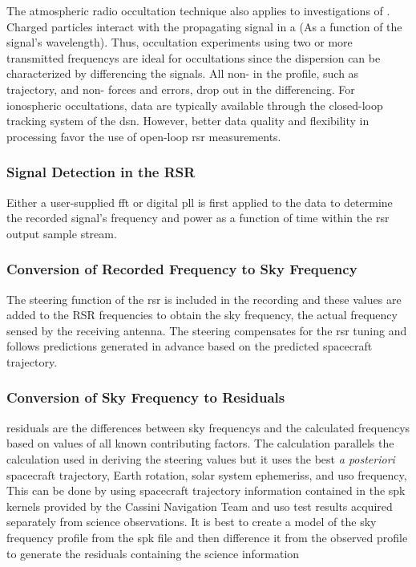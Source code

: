 \documentclass[oneside]{book}
\theoremstyle{mystyle}
\begin{document}
The atmospheric radio \gls{occultation} technique also applies to investigations of . Charged particles interact with the propagating signal in a  (As a function of the signal’s wavelength). Thus, \gls{occultation} experiments using two or more transmitted \glspl{frequency} are ideal for  \glspl{occultation} since the \gls{dispersion} can be characterized by differencing the signals. All non- in the  profile, such as \gls{trajectory},  and non- forces and errors, drop out in the differencing. For ionospheric \glspl{occultation},  data are typically available through the \gls{closed-loop} tracking system of the \gls{dsn}. However, better data quality and flexibility in processing favor the use of \gls{open-loop} \gls{rsr} measurements.

\subsubsection{\footnotesize Signal Detection in the RSR}

Either a user-supplied \gls{fft} or digital \gls{pll} is first applied to the data to determine the recorded signal’s \gls{frequency} and \gls{power} as a function of time within the \gls{rsr} output sample stream. 

\subsubsection{\footnotesize Conversion of Recorded Frequency to Sky Frequency}

The \gls{steering function} of the \gls{rsr} is included in the recording and these values are added to the RSR frequencies to obtain the sky frequency, the actual \gls{frequency} sensed by the receiving antenna. The \gls{steering} compensates for the \gls{rsr} tuning and follows predictions generated in advance based on the predicted spacecraft \gls{trajectory}.

\subsubsection{\footnotesize Conversion of Sky Frequency to Residuals}

\Glspl{residual} are the differences between \glspl{sky frequency} and the calculated \glspl{frequency} based on values of all known contributing factors. The calculation parallels the calculation used in deriving the \gls{steering} values but it uses the best \textit{a posteriori} spacecraft \gls{trajectory}, Earth \gls{rotation}, solar system \glspl{ephemeris}, and \gls{uso} \gls{frequency}, This can be done by using spacecraft trajectory information contained in the \gls{spk} \glspl{kernel} provided by the Cassini Navigation Team and \gls{uso} test results acquired separately from science observations. It is best to create a model of the \gls{sky frequency} profile from the \gls{spk} file and then difference it from the observed profile to generate the residuals containing the science information
%
\end{document}
